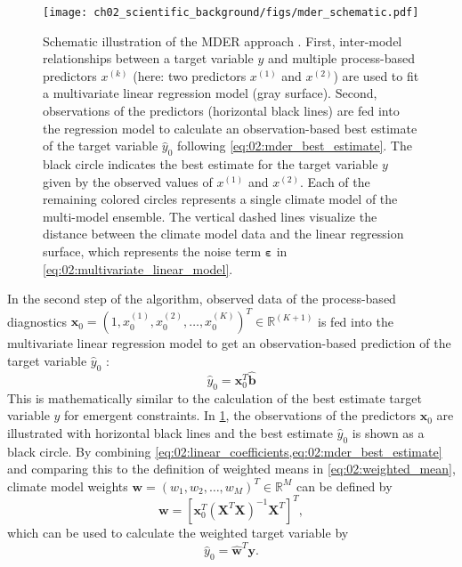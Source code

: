 \begin{figure}[t]
  \centering
  \texttt{[image: 
    ch02\_scientific\_background/figs/mder\_schematic.pdf]}
  \caption[
    Schematic illustration of the \acf{MDER} approach.
  ]{
    Schematic illustration of the \acf{MDER} approach \autocite{Karpechko2013}.
    First, inter-model relationships between a target variable $y$ and multiple
    process-based predictors $x^{(k)}$ (here: two predictors $x^{(1)}$ and
    $x^{(2)}$) are used to fit a multivariate linear regression model (gray
    surface). Second, observations of the predictors (horizontal black lines)
    are fed into the regression model to calculate an observation-based best
    estimate of the target variable $\hat{y}_0$ following
    \cref{eq:02:mder_best_estimate}. The black circle indicates the best
    estimate for the target variable $y$ given by the observed values of
    $x^{(1)}$ and $x^{(2)}$. Each of the remaining colored circles represents a
    single climate model of the multi-model ensemble. The vertical dashed lines
    visualize the distance between the climate model data and the linear
    regression surface, which represents the noise term $\bm{\varepsilon}$ in
    \cref{eq:02:multivariate_linear_model}.
  }
  \label{fig:02:mder}
\end{figure}

In the second step of the algorithm, observed data of the process-based
diagnostics $\bm{x}_0 = \left( 1, x_0^{(1)}, x_0^{(2)}, \ldots, x_0^{(K)}
\right)^T \in \mathbb{R}^{(K + 1)}$ is fed into the multivariate linear
regression model to get an observation-based prediction of the target variable
$\hat{y}_0$
\autocite{Karpechko2013}:
\begin{equation}
  \hat{y}_0 = \bm{x}_0^T \hat{\bm{b}}
  \label{eq:02:mder_best_estimate}
\end{equation}
This is mathematically similar to the calculation of the best estimate target
variable $y$ for emergent constraints. In \cref{fig:02:mder}, the observations
of the predictors $\bm{x}_0$ are illustrated with horizontal black lines and
the best estimate $\hat{y}_0$ is shown as a black circle. By combining
\cref{eq:02:linear_coefficients,eq:02:mder_best_estimate} and comparing this to
the definition of weighted means in \cref{eq:02:weighted_mean}, climate model
weights $\bm{w} = \left( w_1, w_2, \ldots, w_M \right)^T \in \mathbb{R}^M$ can
be defined by
\begin{equation}
  \bm{w} = \left[ \bm{x}_0^T \left( \bm{X}^T \bm{X} \right)^{-1} \bm{X}^T
  \right]^T,
  \label{eq:02:mder_weights}
\end{equation}
which can be used to calculate the weighted target variable by
\begin{equation}
  \hat{y}_0 = \hat{\bm{w}}^T \bm{y}.
  \label{eq:02:weighted_mean_vector}
\end{equation}

